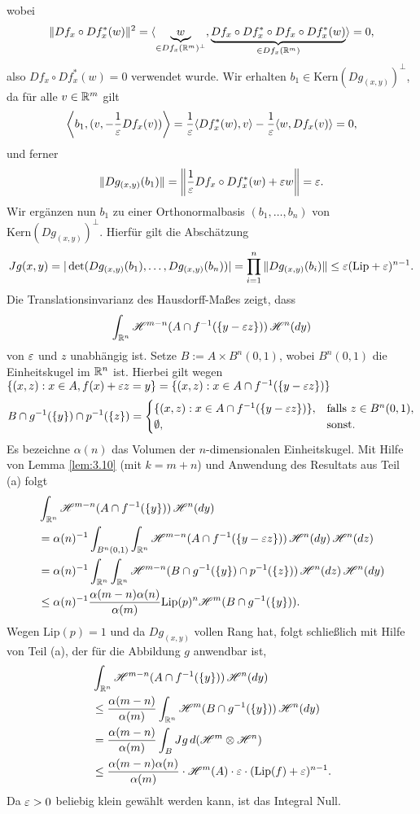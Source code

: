 \documentclass[a4paper,twoside,DIV15,BCOR12mm]{scrbook}
\newcommand{\HM}{\H}
\begin{document}
\begin{beweis}
\begin{enumerate}[\quad(a)]
$$$$
wobei
$$ 
\|Df_x\circ Df_x^*(w)\|^2=\langle \underbrace{w}_{\in Df_x(\mathbb{R}^m)^\perp},\underbrace{Df_x\circ Df_x^*\circ Df_x\circ Df_x^*(w)}_{\in Df_x(\mathbb{R}^m)}\rangle=0,
$$
also $Df_x\circ Df_x^*(w)=0$ verwendet wurde. Wir erhalten $b_1\in \text{Kern}(Dg_{(x,y)})^\perp$, da für alle 
$v\in\mathbb{R}^m$ gilt
$$
\left\langle b_1,(v,-\frac{1}{\varepsilon}Df_x(v))\right\rangle=\frac{1}{\varepsilon}\langle Df_x^*(w),v\rangle -\frac{1}{\varepsilon}\langle
w,Df_x(v)\rangle =0,
$$
und ferner
$$
\|Dg_{(x,y)}(b_1)\|=\left\|\frac{1}{\varepsilon} Df_x\circ Df_x^*(w)+\varepsilon w\right\|=\varepsilon.
$$
Wir ergänzen nun $b_1$ zu einer Orthonormalbasis $(b_1,\ldots,b_n)$ von $\text{Kern}(Dg_{(x,y)})^\perp$. 
Hierfür gilt die Abschätzung
$$
Jg(x,y)=|\det(Dg_{(x,y)}(b_1),\ldots, Dg_{(x,y)}(b_n))|=
\prod_{i=1}^n\|Dg_{(x,y)}(b_i)\|\le \varepsilon(\text{Lip}+\varepsilon)^{n-1}.
$$
Die Translationsinvarianz des Hausdorff-Maßes zeigt, dass
$$
\int_{\MdR^n}\HM^{m-n}(A\cap f^{-1}(\{y-\ep z\}))\, \HM^n(dy)
$$
von $\varepsilon$ und $z$ unabhängig ist. Setze $B:=A\times B^n(0,1)$, wobei $B^n(0,1)$ die Einheitskugel im $\mathbb{R}^n$ ist. 
Hierbei gilt wegen $\{(x,z):x\in A,f(x)+\varepsilon z=y\}=\{(x,z):x\in A\cap f^{-1}(\{y-\varepsilon z\})\}$ 
$$
B\cap g^{-1}(\{y\})\cap p^{-1}(\{z\})
=\begin{cases}
\{(x,z):x\in A\cap f^{-1}(\{y-\varepsilon z\})\},& \text{falls } z\in B^n(0,1),\\
\emptyset,&\text{sonst}.
\end{cases}
$$
Es bezeichne $\alpha(n)$ das Volumen der $n$-dimensionalen Einheitskugel. 
Mit Hilfe von Lemma \ref{lem:3.10} (mit $k=m+n$) und Anwendung des Resultats aus Teil (a) folgt
\begin{align*}
&\int_{\MdR^n}\HM^{m-n}(A\cap f^{-1}(\{y\}))\,\HM^n(dy)\\
&=\alpha(n)^{-1}\int_{B^n(0,1)}\int_{\MdR^n}\HM^{m-n}(A\cap f^{-1}(\{y-\ep z\}))\,\HM^n(dy)\, \HM^n(dz)\\
&=\alpha(n)^{-1}\int_{\MdR^n}\int_{\MdR^n}\HM^{m-n}(B\cap g^{-1}(\{y\})\cap p^{-1}(\{z\}))\,\HM^n(dz)\, \HM^n(dy)\\
&\le \alpha(n)^{-1}\frac{\alpha(m-n)\alpha(n)}{\alpha(m)}\text{Lip}(p)^n\HM^m(B\cap g^{-1}(\{y\})).
\end{align*}
Wegen $\text{Lip}(p)=1$ und da $Dg_{(x,y)}$ vollen Rang hat, folgt schließlich mit Hilfe von 
Teil (a), der für die Abbildung $g$ anwendbar ist,
\begin{align*}
&\int_{\MdR^n}\HM^{m-n}(A\cap f^{-1}(\{y\}))\,\HM^n(dy)\\
&\le\frac{\alpha(m-n)}{\alpha(m)}\int_{\MdR^n}\HM^m(B\cap g^{-1}(\{y\}))\, \HM^n(dy)\\
&=\frac{\alpha(m-n)}{\alpha(m)}\int_{B}Jg\, d(\HM^m\otimes\HM^n)\\
&\le \frac{\alpha(m-n)\alpha(n)}{\alpha(m)}\cdot\HM^m(A)\cdot \ep\cdot(\text{Lip}(f)+\ep)^{n-1}.
\end{align*}
Da $\varepsilon>0$ beliebig klein gewählt werden kann, ist das Integral Null.
\end{enumerate}
\end{beweis}
\end{document}
